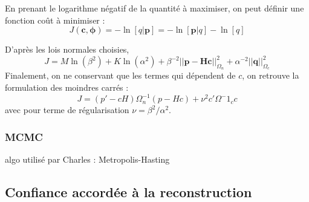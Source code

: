 En prenant le logarithme négatif de la quantité à maximiser, on peut définir une fonction coût à minimiser : 
\begin{equation}
	J(\bm{c},\bm{\phi}) = - \ln[q|\bm{p}] = -\ln[\bm{p}|q]-\ln[q]
\end{equation}

D'après les lois normales choisies, 
\begin{equation}
J=M\ln(\beta^2) + K\ln(\alpha^2) +\beta^{-2}||\bm{p}-\bm{Hc}||^2_{\Omega_n}+\alpha^{-2}||\bm{q}||^2_{\Omega_c}
\end{equation}
Finalement, on ne conservant que les termes qui dépendent de $c$, on retrouve la formulation des moindres carrés : 
\begin{equation}
 J = (p'-cH)\Omega^{-1}_n(p-Hc) + \nu^2c'\Omega^-1_c c
\end{equation}
avec pour terme de régularisation $\nu = \beta^2/\alpha^2$.





\subsubsection{MCMC}
algo utilisé par Charles : Metropolis-Hasting


\subsection{Confiance accordée à la reconstruction}

	
